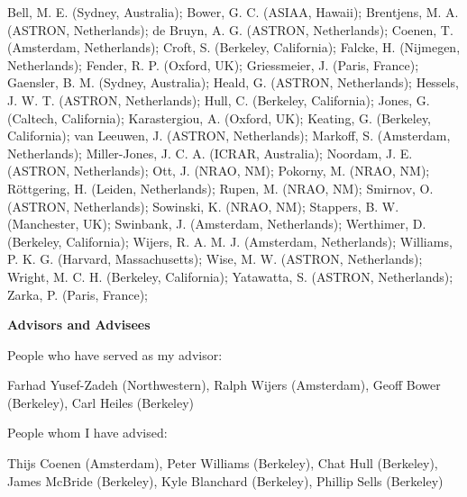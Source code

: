 \documentclass[11pt]{article}
\begin{document}
Bell, M. E. (Sydney, Australia);
Bower, G. C. (ASIAA, Hawaii);
Brentjens, M. A. (ASTRON, Netherlands);
de Bruyn, A. G. (ASTRON, Netherlands);
Coenen, T. (Amsterdam, Netherlands);
Croft, S. (Berkeley, California);
Falcke, H. (Nijmegen, Netherlands);
Fender, R. P. (Oxford, UK);
Griessmeier, J. (Paris, France);
Gaensler, B. M. (Sydney, Australia);
Heald, G. (ASTRON, Netherlands);
Hessels, J. W. T. (ASTRON, Netherlands);
Hull, C. (Berkeley, California);
Jones, G. (Caltech, California);
Karastergiou, A. (Oxford, UK);
Keating, G. (Berkeley, California);
van Leeuwen, J. (ASTRON, Netherlands);
Markoff, S. (Amsterdam, Netherlands);
Miller-Jones, J. C. A. (ICRAR, Australia);
Noordam, J. E. (ASTRON, Netherlands);
Ott, J. (NRAO, NM);
Pokorny, M. (NRAO, NM);
R\"ottgering, H. (Leiden, Netherlands);
Rupen, M. (NRAO, NM);
Smirnov, O. (ASTRON, Netherlands);
Sowinski, K. (NRAO, NM);
Stappers, B. W. (Manchester, UK);
Swinbank, J. (Amsterdam, Netherlands);
Werthimer, D. (Berkeley, California);
Wijers, R. A. M. J. (Amsterdam, Netherlands);
Williams, P. K. G. (Harvard, Massachusetts);
Wise, M. W. (ASTRON, Netherlands);
Wright, M. C. H. (Berkeley, California);
Yatawatta, S. (ASTRON, Netherlands);
Zarka, P. (Paris, France);

{\bf Advisors and Advisees}

People who have served as my advisor:

Farhad Yusef-Zadeh (Northwestern), Ralph Wijers (Amsterdam), Geoff Bower (Berkeley), Carl Heiles (Berkeley)

People whom I have advised:

Thijs Coenen (Amsterdam), Peter Williams (Berkeley), Chat Hull (Berkeley), James McBride (Berkeley), Kyle Blanchard (Berkeley), Phillip Sells (Berkeley)

\thispagestyle{empty}
\end{document}
